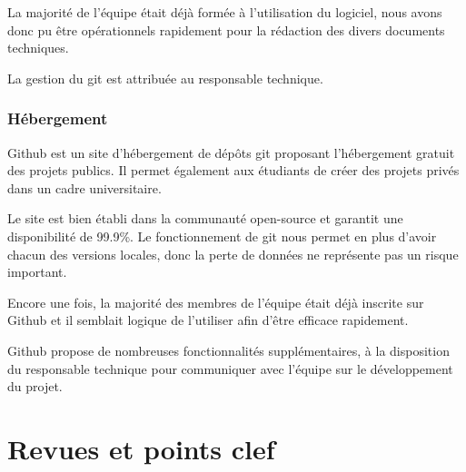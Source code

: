 \documentclass{../../res/univ-projet}
\begin{document}
	La majorité de l'équipe était déjà formée à l'utilisation du logiciel, nous avons donc pu être opérationnels rapidement pour la rédaction des divers documents techniques.

	La gestion du git est attribuée au responsable technique.

\subsubsection{Hébergement}
	Github est un site d'hébergement de dépôts git proposant l'hébergement gratuit des projets publics. Il permet également aux étudiants de créer des projets privés dans un cadre universitaire.

	Le site est bien établi dans la communauté open-source et garantit une disponibilité de 99.9\%. Le fonctionnement de git nous permet en plus d'avoir chacun des versions locales, donc la perte de données ne représente pas un risque important.

	Encore une fois, la majorité des membres de l'équipe était déjà inscrite sur Github et il semblait logique de l'utiliser afin d'être efficace rapidement. 

	Github propose de nombreuses fonctionnalités supplémentaires, à la disposition du responsable technique pour communiquer avec l'équipe sur le développement du projet.

\newpage
\section{Revues et points clef}
\end{document}
